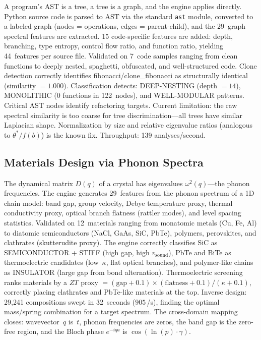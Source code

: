 \documentclass[11pt]{amsart}
\begin{document}
A program's AST is a tree, a tree is a graph, and the engine applies
directly. Python source code is parsed to AST via the standard \texttt{ast}
module, converted to a labeled graph (nodes = operations, edges =
parent-child), and the 29~graph spectral features are extracted. 15
code-specific features are added: depth, branching, type entropy, control
flow ratio, and function ratio, yielding 44~features per source file.
Validated on 7~code samples ranging from clean functions to deeply nested,
spaghetti, obfuscated, and well-structured code. Clone detection correctly
identifies fibonacci/clone\_fibonacci as structurally identical (similarity
$= 1.000$). Classification detects: DEEP-NESTING (depth $= 14$), MONOLITHIC
(0 functions in 122~nodes), and WELL-MODULAR patterns. Critical AST nodes
identify refactoring targets. Current limitation: the raw spectral similarity
is too coarse for tree discrimination---all trees have similar Laplacian
shape. Normalization by size and relative eigenvalue ratios (analogous to
$\theta^*/f(b)$) is the known fix. Throughput: 139 analyses/second.

\subsection{Materials Design via Phonon Spectra}

The dynamical matrix $D(q)$ of a crystal has eigenvalues $\omega^2(q)$---the
phonon frequencies. The engine generates 29~features from the phonon spectrum
of a 1D chain model: band gap, group velocity, Debye temperature proxy,
thermal conductivity proxy, optical branch flatness (rattler modes), and
level spacing statistics. Validated on 12~materials ranging from monatomic
metals (Cu, Fe, Al) to diatomic semiconductors (NaCl, GaAs, SiC, PbTe),
polymers, perovskites, and clathrates (skutterudite proxy). The engine
correctly classifies SiC as SEMICONDUCTOR + STIFF (high gap, high
$v_\text{sound}$), PbTe and BiTe as thermoelectric candidates (low~$\kappa$,
flat optical branches), and polymer-like chains as INSULATOR (large gap from
bond alternation). Thermoelectric screening ranks materials by a $ZT$ proxy
$= (\text{gap} + 0.1)\times(\text{flatness} + 0.1)/(\kappa + 0.1)$,
correctly placing clathrates and PbTe-like materials at the top. Inverse
design: 29,241 compositions swept in 32~seconds ($905\,$/s), finding the
optimal mass/spring combination for a target spectrum. The cross-domain
mapping closes: wavevector~$q$ is~$t$, phonon frequencies are zeros, the
band gap is the zero-free region, and the Bloch phase $e^{-iqa}$ is
$\cos(\ln(p)\cdot\gamma)$.
\end{document}
